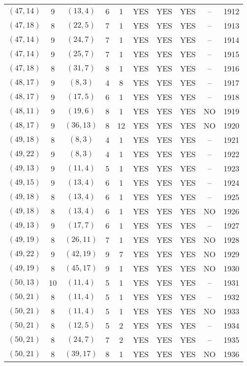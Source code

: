 \begin{longtable}{|c|c|c|c|c|c|c|c|c|c|}
$(47, 14)$ & 9 & $(13, 4)$ & 6 & 1 & YES & YES & YES & -- & 1912\\
$(47, 18)$ & 8 & $(22, 5)$ & 7 & 1 & YES & YES & YES & -- & 1913\\
$(47, 14)$ & 9 & $(24, 7)$ & 7 & 1 & YES & YES & YES & -- & 1914\\
$(47, 14)$ & 9 & $(25, 7)$ & 7 & 1 & YES & YES & YES & -- & 1915\\
$(47, 18)$ & 8 & $(31, 7)$ & 8 & 1 & YES & YES & YES & -- & 1916\\
$(48, 17)$ & 9 & $(8, 3)$ & 4 & 8 & YES & YES & YES & -- & 1917\\
$(48, 17)$ & 9 & $(17, 5)$ & 6 & 1 & YES & YES & YES & -- & 1918\\
$(48, 11)$ & 9 & $(19, 6)$ & 8 & 1 & YES & YES & YES & NO & 1919\\
$(48, 17)$ & 9 & $(36, 13)$ & 8 & 12 & YES & YES & YES & NO & 1920\\
$(49, 18)$ & 8 & $(8, 3)$ & 4 & 1 & YES & YES & YES & -- & 1921\\
$(49, 22)$ & 9 & $(8, 3)$ & 4 & 1 & YES & YES & YES & -- & 1922\\
$(49, 13)$ & 9 & $(11, 4)$ & 5 & 1 & YES & YES & YES & -- & 1923\\
$(49, 15)$ & 9 & $(13, 4)$ & 6 & 1 & YES & YES & YES & -- & 1924\\
$(49, 18)$ & 8 & $(13, 4)$ & 6 & 1 & YES & YES & YES & -- & 1925\\
$(49, 18)$ & 8 & $(13, 4)$ & 6 & 1 & YES & YES & YES & NO & 1926\\
$(49, 13)$ & 9 & $(17, 7)$ & 6 & 1 & YES & YES & YES & -- & 1927\\
$(49, 19)$ & 8 & $(26, 11)$ & 7 & 1 & YES & YES & YES & NO & 1928\\
$(49, 22)$ & 9 & $(42, 19)$ & 9 & 7 & YES & YES & YES & NO & 1929\\
$(49, 19)$ & 8 & $(45, 17)$ & 9 & 1 & YES & YES & YES & NO & 1930\\
$(50, 13)$ & 10 & $(11, 4)$ & 5 & 1 & YES & YES & YES & -- & 1931\\
$(50, 21)$ & 8 & $(11, 4)$ & 5 & 1 & YES & YES & YES & -- & 1932\\
$(50, 21)$ & 8 & $(11, 4)$ & 5 & 1 & YES & YES & YES & NO & 1933\\
$(50, 21)$ & 8 & $(12, 5)$ & 5 & 2 & YES & YES & YES & -- & 1934\\
$(50, 21)$ & 8 & $(24, 7)$ & 7 & 2 & YES & YES & YES & -- & 1935\\
$(50, 21)$ & 8 & $(39, 17)$ & 8 & 1 & YES & YES & YES & NO & 1936\\

\end{longtable}
